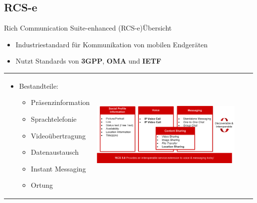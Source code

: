 \documentclass{beamer}
\begin{document}
\subsection{RCS-e}
\begin{frame}{Rich Communication Suite-enhanced (RCS-e)}{Übersicht\cite{rcs:spec}}
	\begin{itemize}
		\item Industriestandard für Kommunikation von mobilen Endgeräten
		\item Nutzt Standards von \textbf{3GPP}, \textbf{OMA} und \textbf{IETF}
	\end{itemize}
	\hspace{-0.28cm}
	\begin{tabular}{ll}
	 \begin{minipage}{0.4\textwidth}
	\begin{itemize}
		\item Bestandteile:
		\begin{itemize}
			\item Präsenzinformation
			\item Sprachtelefonie
			\item Videoübertragung
			\item Datenaustausch
			\item Instant Messaging
			\item Ortung
		\end{itemize}
	\end{itemize}
	 \end{minipage}
	 &
	 \begin{minipage}{0.6\textwidth}
		\includegraphics[width=0.9\textwidth]{img/rcs-e-overview}
	 \end{minipage}
	\end{tabular}
\end{frame}
\end{document}
